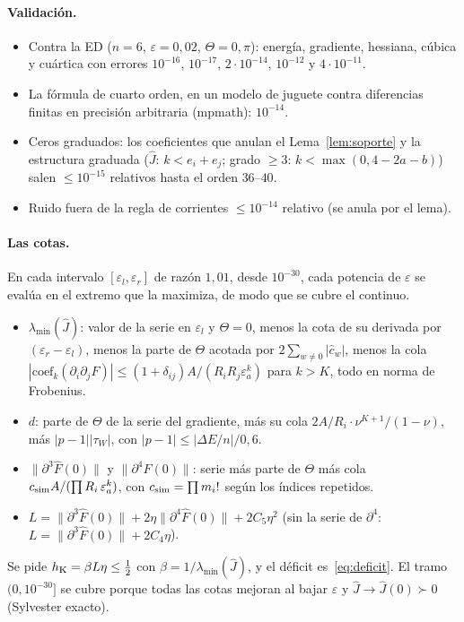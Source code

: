 \documentclass[11pt,a4paper]{article}
\theoremstyle{definition}
\theoremstyle{remark}
\newcommand{\eps}{\varepsilon}
\begin{document}
\paragraph{Validación.}
\begin{itemize}
\item Contra la ED ($n=6$, $\eps=0{,}02$, $\Theta=0,\pi$): energía, gradiente, hessiana, cúbica y cuártica
  con errores $10^{-16}$, $10^{-17}$, $2\cdot10^{-14}$, $10^{-12}$ y $4\cdot10^{-11}$.
\item La fórmula de cuarto orden, en un modelo de juguete contra diferencias finitas en precisión
  arbitraria (mpmath): $10^{-14}$.
\item Ceros graduados: los coeficientes que anulan el Lema~\ref{lem:soporte} y la estructura graduada
  ($\hat J$: $k<e_i+e_j$; grado $\ge3$: $k<\max(0,4-2a-b)$) salen $\le10^{-15}$ relativos hasta el orden
  $36$--$40$.
\item Ruido fuera de la regla de corrientes $\le10^{-14}$ relativo (se anula por el lema).
\end{itemize}

\paragraph{Las cotas.} En cada intervalo $[\eps_l,\eps_r]$ de razón $1{,}01$, desde $10^{-30}$, cada
potencia de $\eps$ se evalúa en el extremo que la maximiza, de modo que se cubre el continuo.
\begin{itemize}
\item $\lambda_{\min}(\hat J)$: valor de la serie en $\eps_l$ y $\Theta=0$, menos la cota de su derivada
  por $(\eps_r-\eps_l)$, menos la parte de $\Theta$ acotada por $2\sum_{w\ne0}|\hat c_w|$, menos la cola
  $|\text{coef}_k(\partial_i\partial_jF)|\le(1+\delta_{ij})A/(R_iR_j\eps_a^k)$ para $k>K$, todo en norma de
  Frobenius.
\item $d$: parte de $\Theta$ de la serie del gradiente, más su cola $2A/R_i\cdot\nu^{K+1}/(1-\nu)$,
  más $|p-1||\tau_W|$, con $|p-1|\le|\Delta E/n|/0{,}6$.
\item $\|\partial^3\hat F(0)\|$ y $\|\partial^4\hat F(0)\|$: serie más parte de $\Theta$ más cola
  $c_{\rm sim}A/(\prod R_i\,\eps_a^k)$, con $c_{\rm sim}=\prod m_i!$ según los índices repetidos.
\item $L=\|\partial^3\hat F(0)\|+2\eta\|\partial^4\hat F(0)\|+2C_5\eta^2$ (sin la serie de
  $\partial^4$: $L=\|\partial^3\hat F(0)\|+2C_4\eta$).
\end{itemize}
Se pide $h_{\rm K}=\beta L\eta\le\frac12$ con $\beta=1/\lambda_{\min}(\hat J)$, y el déficit es~\eqref{eq:deficit}.
El tramo $(0,10^{-30}]$ se cubre porque todas las cotas mejoran al bajar $\eps$ y
$\hat J\to\hat J(0)\succ0$ (Sylvester exacto).
\end{document}
